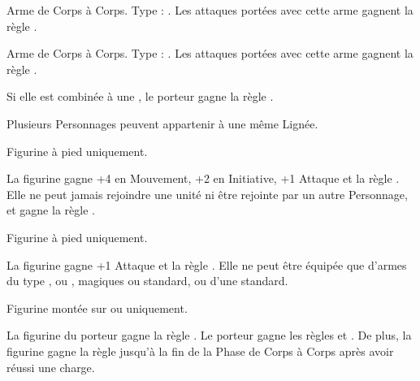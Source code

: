 \listitemonecol{\sylvanlance} Arme de Corps à Corps. Type : \lightlance{}. Les attaques portées avec cette arme gagnent la règle .

\listitemonecol{\sylvanblades} Arme de Corps à Corps. Type : \pw{}. Les attaques portées avec cette arme gagnent la règle .

\listitemonecol{\elvencloak} Si elle est combinée à une \la{}, le porteur gagne la règle .

\enditemlistonecol

\closearmyarmoury







\newpage
\begin{multicols}{2}\raggedcolumns
\toctarget{kindredstitle}{%
\vspace*{-1.5cm}\section*{}\noindent\begin{center}\hugefontsize\textbf{\antiquefont\expandafter\uppercase\expandafter{\kindreds}}\end{center}
\largefontsize
}

\spaceaftersection{}

Plusieurs Personnages peuvent appartenir à une même Lignée.

\startpricelistNSP

Figurine à pied uniquement.

La figurine gagne +4 en Mouvement, +2 en Initiative, +1 Attaque et la règle . Elle ne peut jamais rejoindre une unité ni être rejointe par un autre Personnage, et gagne la règle \notaleader{}.

Figurine à pied uniquement.

La figurine gagne +1 Attaque et la règle . Elle ne peut être équipée que d'armes du type \spear{}, \gw{} ou \sylvanblades{}, magiques ou standard, ou d'une \hw{} standard.

Figurine montée sur \elvenhorse{} ou \greatelk{} uniquement.

La figurine du porteur gagne la règle \frenzy{}. Le porteur gagne les règles \devastatingcharge{} et \lighttroops{}. De plus, la figurine gagne la règle \fear{} jusqu'à la fin de la Phase de Corps à Corps après avoir réussi une charge.


\end{multicols}
